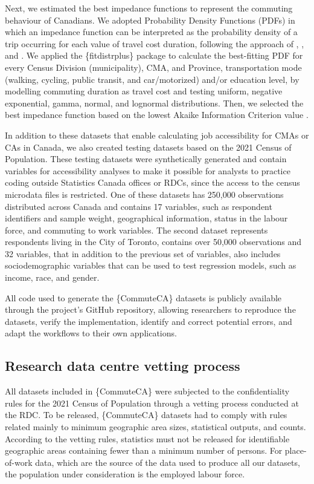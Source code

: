 \documentclass[sn-basic,lineno,pdflatex]{sn-jnl}
\begin{document}
Next, we estimated the best impedance functions to represent the
commuting behaviour of Canadians. We adopted Probability Density
Functions (PDFs) in which an impedance function can be interpreted as
the probability density of a trip occurring for each value of travel
cost duration, following the approach of \citet{soukhov2024},
\citet{sveda2023}, and \citet{dossantos2026}. We applied the
\{fitdistrplus\} package \citep{delignette2015fitdistrplus} to calculate
the best-fitting PDF for every Census Division (municipality), CMA, and
Province, transportation mode (walking, cycling, public transit, and
car/motorized) and/or education level, by modelling commuting duration
as travel cost and testing uniform, negative exponential, gamma, normal,
and lognormal distributions. Then, we selected the best impedance
function based on the lowest Akaike Information Criterion value
\citep{akaike1974}.

In addition to these datasets that enable calculating job accessibility
for CMAs or CAs in Canada, we also created testing datasets based on the
2021 Census of Population. These testing datasets were synthetically
generated and contain variables for accessibility analyses to make it
possible for analysts to practice coding outside Statistics Canada
offices or RDCs, since the access to the census microdata files is
restricted. One of these datasets has 250,000 observations distributed
across Canada and contains 17 variables, such as respondent identifiers
and sample weight, geographical information, status in the labour force,
and commuting to work variables. The second dataset represents
respondents living in the City of Toronto, contains over 50,000
observations and 32 variables, that in addition to the previous set of
variables, also includes sociodemographic variables that can be used to
test regression models, such as income, race, and gender.

All code used to generate the \{CommuteCA\} datasets is publicly
available through the project's GitHub repository, allowing researchers
to reproduce the datasets, verify the implementation, identify and
correct potential errors, and adapt the workflows to their own
applications.

\subsection{Research data centre vetting
process}\label{research-data-centre-vetting-process}

All datasets included in \{CommuteCA\} were subjected to the
confidentiality rules for the 2021 Census of Population through a
vetting process conducted at the RDC. To be released, \{CommuteCA\}
datasets had to comply with rules related mainly to minimum geographic
area sizes, statistical outputs, and counts. According to the vetting
rules, statistics must not be released for identifiable geographic areas
containing fewer than a minimum number of persons. For place-of-work
data, which are the source of the data used to produce all our datasets,
the population under consideration is the employed labour force.
\end{document}
